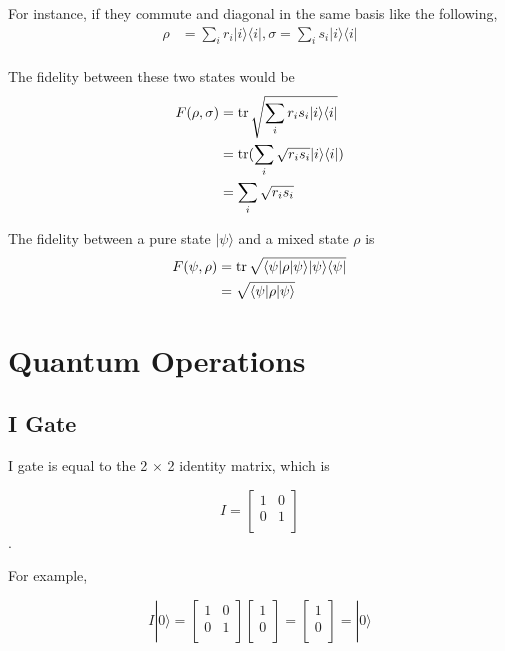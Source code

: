 For instance, if they commute and diagonal in the same basis like the following,
 \begin{equation}
  \begin{split}
    \rho &= \sum_i r_i |i\rangle\langle i|, \sigma= \sum_i s_i |i\rangle\langle i|\\
  \end{split}
\end{equation}

The fidelity between these two states would be
\begin{equation}
  \begin{split}
    F(\rho, \sigma) &= \operatorname{tr}{\sqrt{\sum_i r_i s_i |i\rangle\langle i|}} \\
    &= \operatorname{tr}(\sum_i \sqrt{r_i s_i} |i\rangle\langle i|) \\
    &= \sum_i \sqrt{r_i s_i}
  \end{split}
\end{equation}

The fidelity between a pure state $|\psi\rangle$ and a mixed state $\rho$ is 
\begin{equation}
  \begin{split}
    F(\psi, \rho) &= \operatorname{tr}{\sqrt{\langle\psi|\rho|\psi\rangle|\psi\rangle\langle\psi|}} \\
    &= \sqrt{\langle\psi|\rho|\psi\rangle}
  \end{split}
\end{equation}

\section{Quantum Operations}
\subsection{I Gate}

I gate is equal to the 2 $\times$ 2 identity matrix, which is 

\begin{equation}
I = \begin{bmatrix}
1 & 0 \\
0 & 1 \\
\end{bmatrix}
\end{equation}.

For example,

\begin{equation}
 I|0\rangle = \begin{bmatrix}
1 & 0 \\
0 & 1 \\
\end{bmatrix} 
\left[
\begin{array}{c}
1 \\
0 \\
\end{array}
\right]
= \left[
\begin{array}{c}
1 \\
0 \\
\end{array}
\right]
= |0\rangle
\end{equation}

